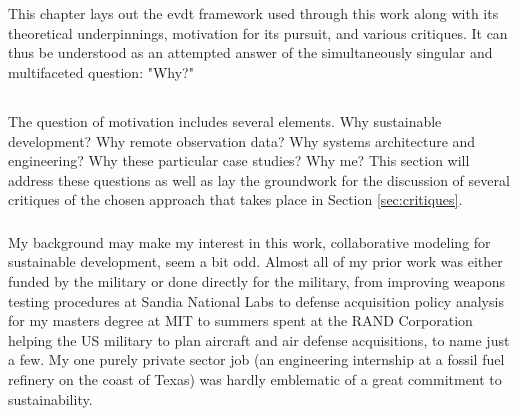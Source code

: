 \chapter{} \label{ch:theory}

This chapter lays out the \ac{evdt} framework used through this work along with its theoretical underpinnings, motivation for its pursuit, and various critiques. It can thus be understood as an attempted answer of the simultaneously singular and multifaceted question: "Why?"

\section{}

The question of motivation includes several elements. Why sustainable development? Why remote observation data? Why systems architecture and engineering? Why these particular case studies? Why me? This section will address these questions as well as lay the groundwork for the discussion of several critiques of the chosen approach that takes place in Section \ref{sec:critiques}.

\subsection{}

My background may make my interest in this work, collaborative modeling for sustainable development, seem a bit odd. Almost all of my prior work was either funded by the military or done directly for the military, from improving weapons testing procedures at Sandia National Labs to defense acquisition policy analysis for my masters degree at MIT to summers spent at the RAND Corporation helping the US military to plan aircraft and air defense acquisitions, to name just a few. My one purely private sector job (an engineering internship at a fossil fuel refinery on the coast of Texas) was hardly emblematic of a great commitment to sustainability.

